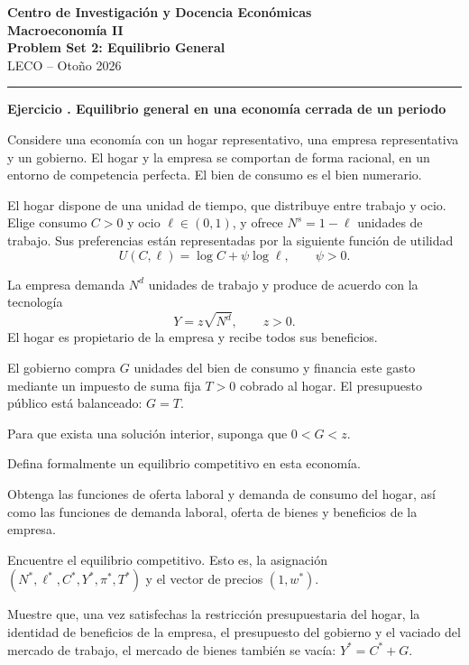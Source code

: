 \documentclass[11pt]{article}
\let\enumerateoriginal\enumerate
\let\endenumerateoriginal\endenumerate
\renewenvironment{enumerate}{%
  \enumerateoriginal
  \setlength{\itemsep}{0.5em}%
  \setlength{\parsep}{0pt}%
  \setlength{\topsep}{0.4em}%
}{\endenumerateoriginal}
\newcounter{problema}
\newenvironment{problema}[1]{%
  \par
  \refstepcounter{problema}%
  \addvspace{0.9em}%
  \noindent\textbf{Ejercicio \theproblema. #1}
  \par\nobreak\smallskip
}{\par}
\begin{document}
\begin{center}
  {\large\textbf{Centro de Investigación y Docencia Económicas}}\\[0.25em]
  {\large\textbf{Macroeconomía II}}\\[0.2em]
  {\large\textbf{Problem Set 2: Equilibrio General}}\\[0.35em]
  LECO -- Otoño 2026
\end{center}

\vspace{0.6em}
\hrule
\vspace{0.6em}

\begin{problema}{Equilibrio general en una economía cerrada de un periodo}
Considere una economía con un hogar representativo, una empresa representativa y un gobierno. El hogar y la empresa se comportan de forma racional, en un entorno de competencia perfecta. El bien de consumo es el bien numerario.

El hogar dispone de una unidad de tiempo, que distribuye entre trabajo y ocio. Elige consumo $C>0$ y ocio $\ell\in(0,1)$, y ofrece $N^s=1-\ell$ unidades de trabajo. Sus preferencias están representadas por la siguiente función de utilidad
\[
  U(C,\ell)=\log C+\psi\log\ell,
  \qquad \psi>0.
\]

La empresa demanda $N^d$ unidades de trabajo y produce de acuerdo con la tecnología
\[
  Y=z\sqrt{N^d},
  \qquad z>0.
\]
El hogar es propietario de la empresa y recibe todos sus beneficios.

El gobierno compra $G$ unidades del bien de consumo y financia este gasto mediante un impuesto de suma fija $T>0$ cobrado al hogar. El presupuesto público está balanceado: $ G=T.$ 

Para que exista una solución interior, suponga que $0< G<z$.

\begin{enumerate}
  \item Defina formalmente un equilibrio competitivo en esta economía.

  \item Obtenga las funciones de oferta laboral y demanda de consumo del hogar, así como las funciones de demanda laboral, oferta de bienes y beneficios de la empresa. 

  \item Encuentre el equilibrio competitivo. Esto es, la asignación $(N^*,\ell^*,C^*,Y^*, \pi^*, T^*)$ y el vector de precios $(1,w^*)$.

  \item Muestre que, una vez satisfechas la restricción presupuestaria del hogar, la identidad de beneficios de la empresa, el presupuesto del gobierno y el vaciado del mercado de trabajo, el mercado de bienes también se vacía: $Y^*=C^*+G$.


\end{enumerate}
\end{problema}
\end{document}
